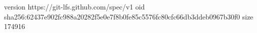 version https://git-lfs.github.com/spec/v1
oid sha256:62437e902fc988a20282f5e0e7f8b0fe85c5576fc80cfc66db3ddeb0967b30f0
size 174916
